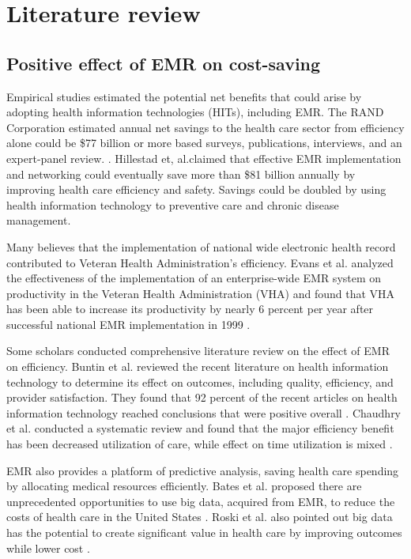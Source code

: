 \section{Literature review}

\subsection{Positive effect of EMR on cost-saving}

Empirical studies estimated the potential net benefits that could arise by adopting health information technologies (HITs), including EMR. The RAND Corporation estimated annual net savings to the health care sector from efficiency alone could be \$77 billion or more based surveys, publications, interviews, and an expert-panel review. \citep{Rand2005}. Hillestad et, al.claimed that effective EMR implementation and networking could eventually save more than \$81 billion annually by improving health care efficiency and safety. Savings could be doubled by using health information technology to preventive care and chronic disease management.\citep{Hillestad2005} 

Many believes that the implementation of national wide electronic health record contributed to Veteran Health Administration's efficiency. Evans et al. analyzed the effectiveness of the implementation of an enterprise-wide EMR system on productivity in the Veteran Health Administration (VHA) and found that VHA has been able to increase its productivity by nearly 6 percent per year after successful national EMR implementation in 1999 \citep{Evans2005}. 

Some scholars conducted comprehensive literature review on the effect of EMR on efficiency. Buntin et al. reviewed the recent literature on health information technology to determine its effect on outcomes, including quality, efficiency, and provider satisfaction. They found that 92 percent of the recent articles on health information technology reached conclusions that were positive overall \citep{Buntin2011}. Chaudhry et al. conducted a systematic review and found that the major efficiency benefit has been decreased utilization of care, while effect on time utilization is mixed \citep{Chaudhry2006}. 

EMR also provides a platform of predictive analysis, saving health care spending by allocating medical resources efficiently. Bates et al. proposed there are unprecedented opportunities to use big data, acquired from EMR, to reduce the costs of health care in the United States \citep{Bates2014}. Roski et al. also pointed out big data has the potential to create significant value in health care by improving outcomes while lower cost \citep{Roski2014}.

